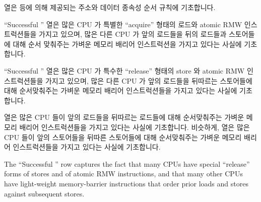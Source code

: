 {	 열은  등에 의해 제공되는
	주소와 데이터 종속성 순서 규칙에 기초합니다.

	``Successful '' 열은 많은 CPU 가 특별한 ``acquire''
	형태의 로드와 atomic RMW 인스트럭션들을 가지고 있으며, 많은 다른 CPU 가
	앞의 로드들을 뒤의 로드들과 스토어들에 대해 순서 맞춰주는 가벼운 메모리
	배리어 인스트럭션을 가지고 있다는 사실에 기초합니다.

	``Successful '' 열은 많은 CPU 가 특수한 ``release''
	형태의 store 와 atomic RMW 인스트럭션들을 가지고 있으며, 많은 다른 CPU
	가 앞의 로드들을 뒤따르는 스토어들에 대해 순서맞춰주는 가벼운 메모리
	배리어 인스트럭션들을 가지고 있다는 사실에 기초합니다.

	 열은 많은 CPU 들이 앞의 로드들을 뒤따르는 로드들에 대해
	순서맞춰주는 가벼운 메모리 배리어 인스트럭션들을 가지고 있다는 사실에
	기초합니다.
	비슷하게,
	 열은 많은 CPU 들이 앞의 스토어들을 뒤따른 스토어들에
	대해 순서맞춰주는 가벼운 메모리 배리어 인스트럭션들을 가지고 있다는
	사실에 기초합니다.
	\iffalse

	The ``Successful '' row captures the fact that many
	CPUs have special ``release'' forms of stores and of atomic RMW
	instructions, and that many other CPUs have light-weight memory-barrier
	instructions that order prior loads and stores against
	subsequent stores.

}
